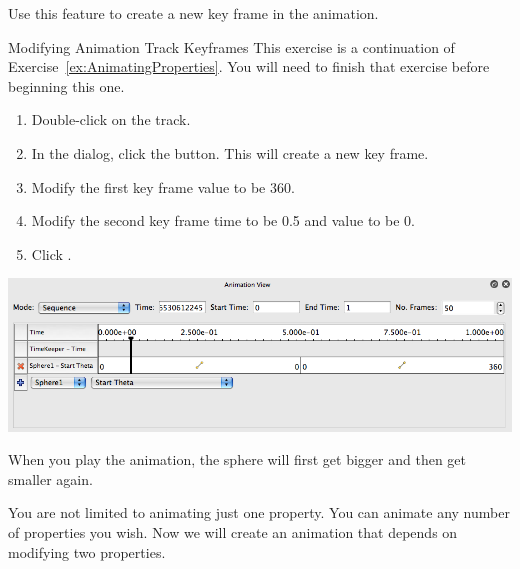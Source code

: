 Use this feature to create a new key frame in the animation.

\begin{exercise}{Modifying Animation Track Keyframes}
  \label{ex:ModifyingAnimationTrackKeyframes}%
  This exercise is a continuation of Exercise~\ref{ex:AnimatingProperties}.
  You will need to finish that exercise before beginning this one.

  \begin{enumerate}
  \item Double-click on the  track.
  \item In the  dialog, click the 
    button.  This will create a new key frame.
  \item Modify the first key frame value to be 360.
  \item Modify the second key frame time to be 0.5 and value to be 0.
  \item Click .
  \end{enumerate}

  \begin{inlinefig}
    \includegraphics[width=.9\linewidth]{images/BuildAnimation2}
  \end{inlinefig}

  When you play the animation, the sphere will first get bigger and then get
  smaller again.
\end{exercise}

You are not limited to animating just one property.  You can animate any
number of properties you wish.  Now we will create an animation that
depends on modifying two properties.

